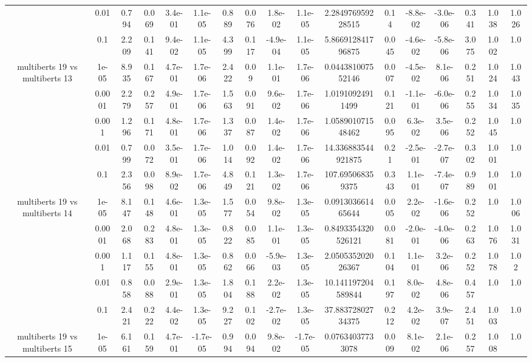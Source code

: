\begin{tabular}{|c|c|c|c|c|c|c|c|c|c|c|c|c|c|c|c|c|}
 & 0.01 & 0.794 & 0.069 & 3.4e-01 & 1.1e-05 & 0.889 & 0.076 & 1.8e-02 & 1.1e-05 & 2.284976959228515 & 0.14 & -8.8e-02 & -3.0e-06 & 0.341 & 1.038 & 1.026 \\
 & 0.1 & 2.209 & 0.141 & 9.4e-02 & 1.1e-05 & 4.399 & 0.117 & -4.9e-04 & 1.1e-05 & 5.866912841796875 & 0.045 & -4.6e-02 & -5.8e-06 & 3.075 & 1.002 & 1.0 \\
\hline
\multirow{5}{*}{multiberts 19 vs multiberts 13} & 1e-05 & 8.935 & 0.167 & 4.7e-01 & 1.7e-06 & 2.422 & 0.09 & 1.1e-01 & 1.7e-06 & 0.044381007552146 & 0.007 & -4.5e-02 & 8.1e-06 & 0.251 & 1.024 & 1.043 \\
 & 0.0001 & 2.279 & 0.257 & 4.9e-01 & 1.7e-06 & 1.563 & 0.091 & 9.6e-02 & 1.7e-06 & 1.01910924911499 & 0.121 & -1.1e-01 & -6.0e-06 & 0.255 & 1.034 & 1.035 \\
 & 0.001 & 1.296 & 0.171 & 4.8e-01 & 1.7e-06 & 1.337 & 0.087 & 1.4e-02 & 1.7e-06 & 1.058901071548462 & 0.095 & 6.3e-02 & 3.5e-06 & 0.252 & 1.045 & 1.0 \\
 & 0.01 & 0.799 & 0.072 & 3.5e-01 & 1.7e-06 & 1.014 & 0.092 & 1.4e-02 & 1.7e-06 & 14.336883544921875 & 0.21 & -2.5e-01 & -2.7e-07 & 0.302 & 1.001 & 1.0 \\
 & 0.1 & 2.356 & 0.098 & 8.9e-02 & 1.7e-06 & 4.849 & 0.121 & 1.3e-02 & 1.7e-06 & 107.695068359375 & 0.343 & 1.1e-01 & -7.4e-07 & 0.989 & 1.001 & 1.0 \\
\hline
\multirow{5}{*}{multiberts 19 vs multiberts 14} & 1e-05 & 8.147 & 0.148 & 4.6e-01 & 1.3e-05 & 1.577 & 0.054 & 9.8e-02 & 1.3e-05 & 0.091303661465644 & 0.005 & 2.2e-02 & -1.6e-06 & 0.252 & 1.0 & 1.006 \\
 & 0.0001 & 2.068 & 0.283 & 4.8e-01 & 1.3e-05 & 0.822 & 0.085 & 1.1e-01 & 1.3e-05 & 0.8493354320526121 & 0.081 & -2.0e-01 & -4.0e-06 & 0.263 & 1.076 & 1.031 \\
 & 0.001 & 1.117 & 0.155 & 4.8e-01 & 1.3e-05 & 0.862 & 0.066 & -5.9e-03 & 1.3e-05 & 2.050535202026367 & 0.104 & 1.1e-01 & 3.2e-06 & 0.252 & 1.078 & 1.02 \\
 & 0.01 & 0.858 & 0.088 & 2.9e-01 & 1.3e-05 & 1.804 & 0.188 & 2.2e-02 & 1.3e-05 & 10.141197204589844 & 0.197 & 8.0e-02 & 4.8e-06 & 0.457 & 1.0 & 1.0 \\
 & 0.1 & 2.421 & 0.222 & 4.4e-02 & 1.3e-05 & 9.227 & 0.102 & -2.7e-02 & 1.3e-05 & 37.88372802734375 & 0.212 & 4.2e-02 & 3.9e-07 & 2.451 & 1.003 & 1.0 \\
\hline
\multirow{5}{*}{multiberts 19 vs multiberts 15} & 1e-05 & 6.161 & 0.159 & 4.7e-01 & -1.7e-05 & 0.994 & 0.094 & 9.8e-02 & -1.7e-05 & 0.07634037733078 & 0.009 & 8.1e-02 & 2.1e-06 & 0.257 & 1.008 & 1.0 \\

\end{tabular}
